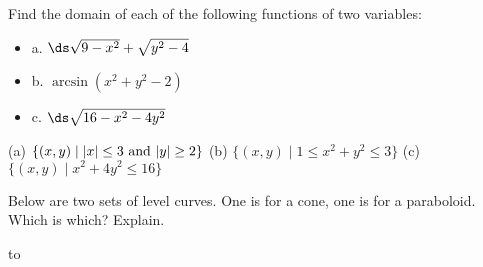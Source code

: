 \begin{exercises}
\exercise Find the domain of each of the following functions of two variables:

\begin{itemize} %
\item{a.}  $\ds\sqrt{9-x^2}+\sqrt{y^2-4}$
\item{b.}  $\arcsin(x^2+y^2-2)$
\item{c.}  $\ds\sqrt{16-x^2-4y^2}$
\end{itemize}
\begin{answer} (a) $\{(x,y)\mid |x|\le3\ \hbox{and}\ |y|\ge2\}$\hfill\break
(b) $\{(x,y)\mid 1\le x^2+y^2\le3\}$\hfill\break
(c) $\{(x,y)\mid x^2+4y^2\le16\}$
\end{answer}

\exercise Below are two sets of level curves.  One is for a cone, one
is for a paraboloid.  Which is which? Explain.

\nobreak
\hbox to 

\end{exercises}

